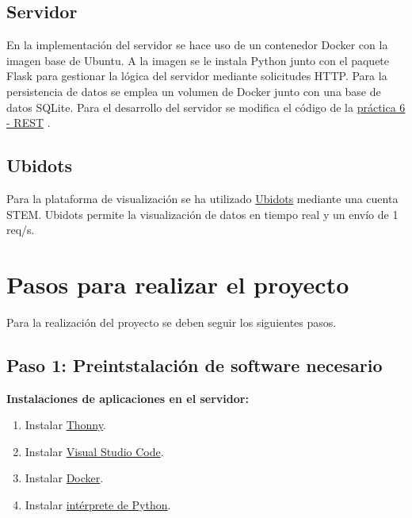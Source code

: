 \documentclass{article}
\begin{document}
\subsection{Servidor}
En la implementación del servidor se hace uso de un contenedor Docker con la imagen base de Ubuntu. 
A la imagen se le instala Python junto con el paquete Flask para gestionar la lógica del servidor mediante solicitudes HTTP. 
Para la persistencia de datos se emplea un volumen de Docker junto con una base de datos SQLite.
Para el desarrollo del servidor se modifica el código de la \href{https://pmanzoni.notion.site/LAB-6-REST-d487dab1b7e24d56b31d8e552a480888}{práctica 6 - REST} \cite{manzoni2024lab6}.


\subsection{Ubidots}
Para la plataforma de visualización se ha utilizado \href{https://stem.ubidots.com/}{Ubidots} mediante una cuenta STEM. Ubidots permite la visualización de datos en tiempo real y un envío de 1 req/s.

\section{Pasos para realizar el proyecto}
Para la realización del proyecto se deben seguir los siguientes pasos.
\subsection{Paso 1: Preintstalación de software necesario}
\textbf{Instalaciones de aplicaciones en el servidor:}
\begin{enumerate}
    \item Instalar \href{https://thonny.org/}{Thonny}.
    \item Instalar \href{https://code.visualstudio.com/download}{Visual Studio Code}.
    \item Instalar \href{https://docs.docker.com/get-docker/}{Docker}.
    \item Instalar \href{https://kinsta.com/es/base-de-conocimiento/instalar-python/}{intérprete de Python}.
\end{enumerate}
\end{document}

